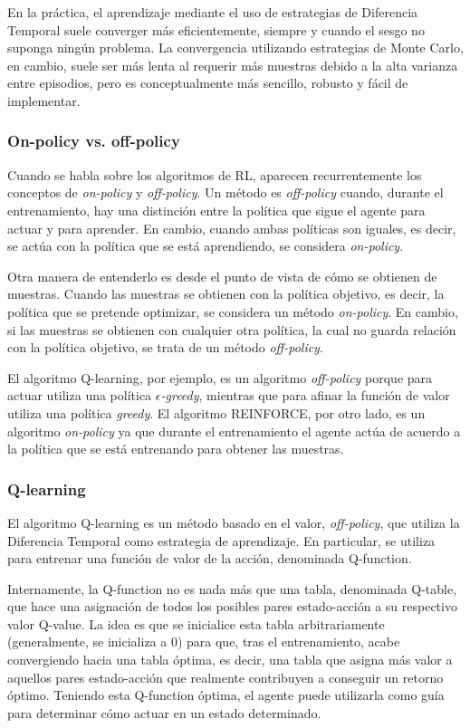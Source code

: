 En la práctica, el aprendizaje mediante el uso de estrategias de Diferencia Temporal suele converger más eficientemente, siempre y cuando el sesgo no suponga ningún problema. La convergencia utilizando estrategias de Monte Carlo, en cambio, suele ser más lenta al requerir más muestras debido a la alta varianza entre episodios, pero es conceptualmente más sencillo, robusto y fácil de implementar.

\subsubsection{On-policy vs. off-policy}

Cuando se habla sobre los algoritmos de RL, aparecen recurrentemente los conceptos de \emph{on-policy} y \emph{off-policy}. Un método es \emph{off-policy} cuando, durante el entrenamiento, hay una distinción entre la política que sigue el agente para actuar y para aprender. En cambio, cuando ambas políticas son iguales, es decir, se actúa con la política que se está aprendiendo, se considera \emph{on-policy}.

Otra manera de entenderlo es desde el punto de vista de cómo se obtienen de muestras. Cuando las muestras se obtienen con la política objetivo, es decir, la política que se pretende optimizar, se considera un método \emph{on-policy}. En cambio, si las muestras se obtienen con cualquier otra política, la cual no guarda relación con la política objetivo, se trata de un método \emph{off-policy}.

El algoritmo Q-learning, por ejemplo, es un algoritmo \emph{off-policy} porque para actuar utiliza una política \emph{$\epsilon$-greedy}, mientras que para afinar la función de valor utiliza una política \emph{greedy}. El algoritmo REINFORCE, por otro lado, es un algoritmo \emph{on-policy} ya que durante el entrenamiento el agente actúa de acuerdo a la política que se está entrenando para obtener las muestras.

\subsubsection{Q-learning}

El algoritmo Q-learning es un método basado en el valor, \emph{off-policy}, que utiliza la Diferencia Temporal como estrategia de aprendizaje. En particular, se utiliza para entrenar una función de valor de la acción, denominada Q-function.

Internamente, la Q-function no es nada más que una tabla, denominada Q-table, que hace una asignación de todos los posibles pares estado-acción a su respectivo valor Q-value. La idea es que se inicialice esta tabla arbitrariamente (generalmente, se inicializa a 0) para que, tras el entrenamiento, acabe convergiendo hacia una tabla óptima, es decir, una tabla que asigna más valor a aquellos pares estado-acción que realmente contribuyen a conseguir un retorno óptimo. Teniendo esta Q-function óptima, el agente puede utilizarla como guía para determinar cómo actuar en un estado determinado.

